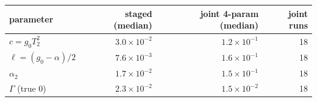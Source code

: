 \begin{tabular}{lrrr}
\toprule
parameter & staged (median) & joint 4-param (median) & joint runs \\
\midrule
$c=g_0T_2^2$ & $3.0\times10^{-2}$ & $1.2\times10^{-1}$ & 18 \\
$\ell=(g_0-\alpha)/2$ & $7.6\times10^{-3}$ & $1.6\times10^{-1}$ & 18 \\
$\alpha_2$ & $1.7\times10^{-2}$ & $1.5\times10^{-1}$ & 18 \\
$\Gamma$ (true 0) & $2.3\times10^{-2}$ & $1.5\times10^{-2}$ & 18 \\
\bottomrule
\end{tabular}